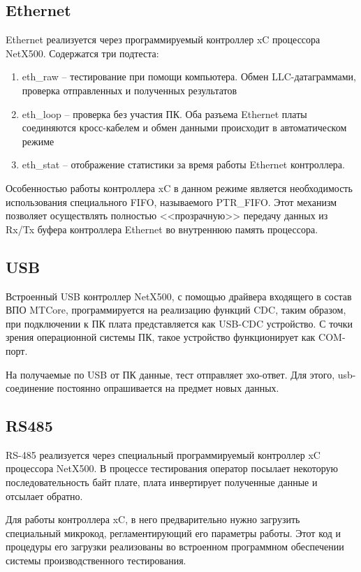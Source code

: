 \documentclass[a4paper,14pt,bachelor]{disser}
\begin{document}
\subsection{Ethernet}
Ethernet реализуется через программируемый контроллер xC процессора NetX500. Содержатся три подтеста:
\begin{enumerate}
 \item eth\_raw -- тестирование при помощи компьютера. Обмен LLC-датаграммами, проверка отправленных и полученных результатов
 \item eth\_loop -- проверка без участия ПК. Оба разъема Ethernet платы соединяются кросс-кабелем и обмен данными происходит в автоматическом режиме
 \item eth\_stat -- отображение статистики за время работы Ethernet контроллера.
\end{enumerate}

Особенностью работы контроллера xC в данном режиме является необходимость использования специального FIFO, называемого PTR\_FIFO. Этот механизм позволяет осуществлять полностью <<прозрачную>> передачу данных из Rx/Tx буфера контроллера Ethernet во внутреннюю память процессора.

\subsection{USB}
Встроенный USB контроллер NetX500, с помощью драйвера входящего в состав ВПО MTCore, программируется на реализацию функций CDC, таким образом, при подключении к ПК плата представляется как USB-CDC устройство. С точки зрения операционной системы ПК, такое устройство функционирует как COM-порт.

На получаемые по USB от ПК данные, тест отправляет эхо-ответ. Для этого, usb-соединение постоянно опрашивается на предмет новых данных.

\subsection{RS485}
RS-485 реализуется через специальный программируемый контроллер xC процессора NetX500. В процессе тестирования оператор посылает некоторую последовательность байт плате, плата инвертирует полученные данные и отсылает обратно.

Для работы контроллера xC, в него предварительно нужно загрузить специальный микрокод, регламентирующий его параметры работы.
 Этот код и процедуры его загрузки реализованы во встроенном программном обеспечении системы производственного тестирования.
\end{document}
